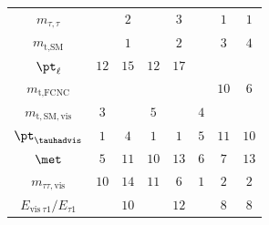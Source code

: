 \documentclass[PAPER, coverpage, atlasdraft=true, texlive=2016, UKenglish]{\ATLASLATEXPATH atlasdoc}
\providecommand{\DIFadd}[1]{{\protect\color{blue}\uwave{#1}}} %
\providecommand{\DIFdel}[1]{{\protect\color{red}\sout{#1}}}                      %
\providecommand{\DIFaddFL}[1]{\DIFadd{#1}} %
\providecommand{\DIFdelFL}[1]{\DIFdel{#1}} %
\providecommand{\DIFaddbeginFL}{} %
\providecommand{\DIFaddendFL}{} %
\providecommand{\DIFdelbeginFL}{} %
\providecommand{\DIFdelendFL}{} %
\begin{document}
\begin{table}[t!]
\begin{tabular}{cccccccc}
 \DIFdelbeginFL \DIFdelFL{$m_{\tau,\tau}$                                     }\DIFdelendFL \DIFaddbeginFL \DIFaddFL{$m_{\tau\tau,\text{fit}}$                                     }\DIFaddendFL &   &  $2$                &           & $3$      &       & $1$      & $1$          \\
 \DIFdelbeginFL \DIFdelFL{$m_{\text{t},\text{SM}}$                            }\DIFdelendFL \DIFaddbeginFL \DIFaddFL{$m_{\text{bjj},\text{fit}}$                            }\DIFaddendFL &   &  $1$                &           & $2$      &       & $3$      & $4$          \\
 \DIFdelbeginFL \DIFdelFL{${\pt}_{\ell}$                                 }\DIFdelendFL \DIFaddbeginFL \DIFaddFL{${\pt}^{\ell}$                                 }\DIFaddendFL & $12$      &  $15$               &  $12$             & $17$     &       &  &         \\
 \DIFdelbeginFL \DIFdelFL{$m_{\text{t},\text{FCNC}}$                          }\DIFdelendFL \DIFaddbeginFL \DIFaddFL{$m_{\tau\tau\text{q},\text{fit}}$                          }\DIFaddendFL &   &             &           &  &       & $10$     & $6$\\
 \DIFdelbeginFL \DIFdelFL{$m_{\text{t},\text{SM},\text{vis}}$                 }\DIFdelendFL \DIFaddbeginFL \DIFaddFL{$m_{\text{bjj}}$                 }\DIFaddendFL & $3$       &             &  $5$              &  & $4$           &  &         \\
 \DIFdelbeginFL \DIFdelFL{${\pt}_{\tauhadvis}$                                 }\DIFdelendFL \DIFaddbeginFL \DIFaddFL{${\pt}_{\tau1}$                                 }\DIFaddendFL & $1$       &  $4$                &  $1$              & $1$      & $5$           & $11$   & $10$           \\
 $\met$                                              & $5$       &  $11$               &  $10$             & $13$     & $6$           & $7$    & $13$          \\
 \DIFdelbeginFL \DIFdelFL{$m_{\tau\tau,\text{vis}}$                           }\DIFdelendFL \DIFaddbeginFL \DIFaddFL{$m_{\tau\tau}$                           }\DIFaddendFL & $10$      &  $14$               &  $11$             & $6$      & $1$           & $2$    & $2$          \\
 \DIFdelbeginFL \DIFdelFL{$E_{\text{vis}~\tau1}/E_{\tau1}$                  }\DIFdelendFL \DIFaddbeginFL \DIFaddFL{$E_{\tau1}/E_{\tau1,\text{fit}}$                  }\DIFaddendFL &   &  $10$               &           & $12$     &       & $8$    & $8$          \\

\end{tabular}
\end{table}
\end{document}
